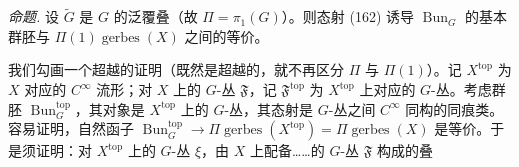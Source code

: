  \emph{命题.} 设 $\tilde G$ 是 $G$ 的泛覆叠（故 $\Pi=\pi_1(G)$）。则态射 (162) 诱导 $\operatorname{Bun}_G$ 的基本群胚与 $\Pi(1)\operatorname{gerbes}(X)$ 之间的等价。

我们勾画一个超越的证明（既然是超越的，就不再区分 $\Pi$ 与 $\Pi(1)$）。记 $X^{\mathrm{top}}$ 为 $X$ 对应的 $C^\infty$ 流形；对 $X$ 上的 $G$-丛 $\mathfrak{F}$，记 $\mathfrak{F}^{\mathrm{top}}$ 为 $X^{\mathrm{top}}$ 上对应的 $G$-丛。考虑群胚 $\operatorname{Bun}_G^{\mathrm{top}}$，其对象是 $X^{\mathrm{top}}$ 上的 $G$-丛，其态射是 $G$-丛之间 $C^\infty$ 同构的同痕类。容易证明，自然函子 $\operatorname{Bun}_G^{\mathrm{top}}\to\Pi\operatorname{gerbes}(X^{\mathrm{top}})=\Pi\operatorname{gerbes}(X)$ 是等价。于是须证明：对 $X^{\mathrm{top}}$ 上的 $G$-丛 $\xi$，由 $X$ 上配备……的 $G$-丛 $\mathfrak{F}$ 构成的叠
